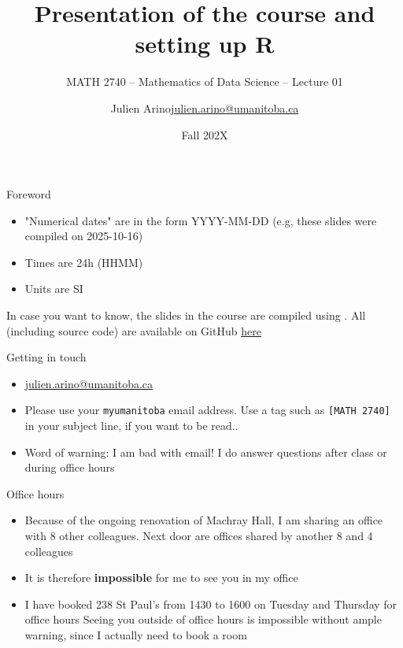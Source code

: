 \documentclass[aspectratio=169]{beamer}\usepackage[]{graphicx}\usepackage[]{xcolor}
\subtitle{MATH 2740 -- Mathematics of Data Science -- Lecture 01}
\author{\texorpdfstring{Julien Arino\newline\url{julien.arino@umanitoba.ca}}{Julien Arino}}
\institute{Department of Mathematics @ University of Manitoba}
\date{Fall 202X}
\title{Presentation of the course and setting up R}
\begin{document}





\begin{frame}{Foreword}
\begin{itemize}
\item "Numerical dates" are in the form YYYY-MM-DD (e.g, these slides were compiled on 2025-10-16)
\vfill
\item Times are 24h (HHMM)
\vfill
\item Units are SI
\end{itemize}
\vfill
In case you want to know, the slides in the course are  compiled using . All (including source code) are available on GitHub \href{https://github.com/julien-arino/math2740-of-data-science}{here}
\end{frame}

\begin{frame}{Getting in touch}
\begin{itemize}
\item \href{mailto:julien.arino@umanitoba.ca}{julien.arino@umanitoba.ca}
\vfill
\item Please use your \texttt{myumanitoba} email address. Use a tag such as \texttt{[MATH 2740]} in your subject line, if you want to be read..
\vfill
\item Word of warning: I am bad with email! I do answer questions after class or during office hours
\end{itemize}
\end{frame}

\begin{frame}{Office hours}
\begin{itemize}
\item Because of the ongoing renovation of Machray Hall, I am sharing an office with 8 other colleagues. Next door are offices shared by another 8 and 4 colleagues
\vfill
\item It is therefore \textbf{impossible} for me to see you in my office
\vfill
\item I have booked 238 St Paul's from 1430 to 1600 on Tuesday and Thursday for office hours
\vfill
Seeing you outside of office hours is impossible without ample warning, since I actually need to book a room
\end{itemize}
\end{frame}
\end{document}
